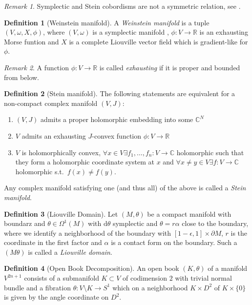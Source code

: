 \documentclass[a4paper]{article}
\newcommand{\RR}{\mathbb{R}}
\newcommand{\CC}{\mathbb{C}}
\newcommand{\dd}{\mathrm{d}}
\newcommand{\del}{\partial}
\newcommand{\lra}{\longrightarrow}
\theoremstyle{definition}
\theoremstyle{definition}
\newtheorem{definition}{Definition}
\theoremstyle{remark}
\newtheorem{rmk}{Remark}
\theoremstyle{remark}
\begin{document}
\begin{rmk}
Symplectic and Stein cobordisms are not a symmetric relation, see \cite{Etnyre2002}.
\end{rmk}

\begin{definition}[Weinstein manifold]
A \emph{Weinstein manifold} is a tuple $(V,\omega,X,\phi)$, where $(V,\omega)$ is a symplectic manifold , $\phi:V\lra\RR$ is an exhausting Morse funtion and $X$ is a complete Liouville vector field which is gradient-like for $\phi$.
\end{definition}

\begin{rmk}
  A function $\phi:V\lra\RR$ is called \emph{exhausting} if it is proper and bounded from below.
\end{rmk}

\begin{definition}[Stein manifold]
  The following statements are equivalent for a non-compact complex manifold $(V,J)$:
  \begin{enumerate}
    \item $(V,J)$ admits a proper holomorphic embedding into some $\CC^N$
    \item $V$ admits an exhausting $J$-convex function $\phi:V\lra\RR$
    \item $V$ is holomorphically convex, $\forall x\in V\exists f_1,\ldots,f_n:V\lra\CC$ holomorphic such that they form a holomorphic coordinate system at $x$ and $\forall x\neq y\in V\exists f:V\lra\CC$ holomorphic s.t.\ $f(x)\neq f(y)$.
  \end{enumerate}
  Any complex manifold satisfying one (and thus all) of the above is called a \emph{Stein manifold}.
\end{definition}

\begin{definition}[Liouville Domain]
  Let $(M,\theta)$ be a compact manifold with boundarz and $\theta\in\Omega^1(M)$ with $\dd\theta$ symplectic and $\theta=r\alpha$ close to the boundary, where we identify a neighborhood of the boundary with $[1-\epsilon,1]\times\del M$, $r$ is the coordinate in the first factor and $\alpha$ is a contact form on the boundary. Such a $(M\theta)$ is called a \emph{Liouville domain}.
\end{definition}

\begin{definition}[Open Book Decomposition]
  An open book $(K,\theta)$ of a manifold $V^{2n+1}$ consists of a submanifold $K\subset V$ of codimension $2$ with trivial normal bundle and a fibration $\theta:V\setminus K\lra S^1$ which on a neighborhood $K\times D^2$ of $K\times\{0\}$ is given by the angle coordinate on $D^2$.
\end{definition}
\end{document}
